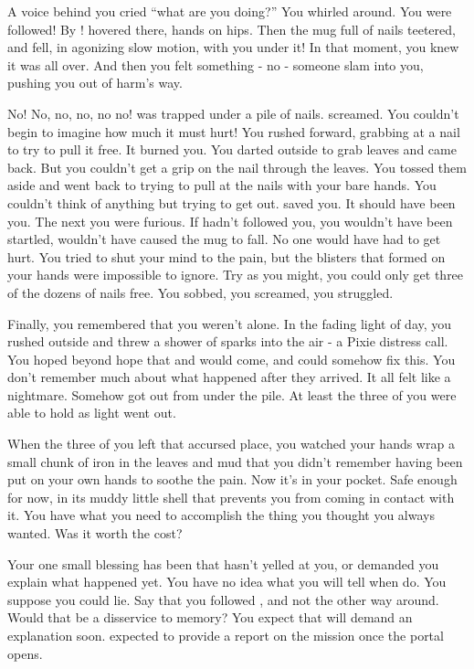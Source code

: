 \documentclass[char]{PP}
\begin{document}
A voice behind you cried “what are you doing?” You whirled around. You were followed! By \cFLost{}! \cFLost{\They} hovered there, hands on \cFLost{\their} hips. Then the mug full of nails teetered, and fell, in agonizing slow motion, with you under it! In that moment, you knew it was all over. And then you felt something - no - someone slam into you, pushing you out of harm's way.

No! No, no, no, no no! \cFLost{} was trapped under a pile of nails. \cFLost{\They} screamed. You couldn’t begin to imagine how much it must hurt! You rushed forward, grabbing at a nail to try to pull it free. It burned you. You darted outside to grab leaves and came back. But you couldn’t get a grip on the nail through the leaves. You tossed them aside and went back to trying to pull at the nails with your bare hands. You couldn’t think of anything but trying to get \cFLost{} out. \cFLost{\They} saved you. It should have been you. The next you were furious. If \cFLost{} hadn’t followed you, you wouldn’t have been startled, wouldn’t have caused the mug to fall. No one would have had to get hurt. You tried to shut your mind to the pain, but the blisters that formed on your hands were impossible to ignore. Try as you might, you could only get three of the dozens of nails free. You sobbed, you screamed, you struggled. 

Finally, you remembered that you weren’t alone. In the fading light of day, you rushed outside and threw a shower of sparks into the air - a Pixie distress call. You hoped beyond hope that \cSPM{} and \cELove{} would come, and could somehow fix this. You don’t remember much about what happened after they arrived. It all felt like a nightmare. Somehow \cELove{} got \cFLost{} out from under the pile.  At least the three of you were able to hold \cFLost{} as \cFLost{\their} light went out.

When the three of you left that accursed place, you watched your hands wrap a small chunk of iron in the leaves and mud that you didn’t remember having been put on your own hands to soothe the pain. Now it’s in your pocket. Safe enough for now, in its muddy little shell that prevents you from coming in contact with it. You have what you need to accomplish the thing you thought you always wanted. Was it worth the cost?

Your one small blessing has been that \cSPM{} hasn’t yelled at you, or demanded you explain what happened yet. You have no idea what you will tell \cSPM{\them} when \cSPM{\they} do. You suppose you could lie. Say that you followed \cFLost{}, and not the other way around. Would that be a disservice to \cFLost{\their} memory? You expect that \cSPM{} will demand an explanation soon. \cSPM{\Theyare} expected to provide \cSHead{} a report on the mission once the portal opens.
\end{document}
